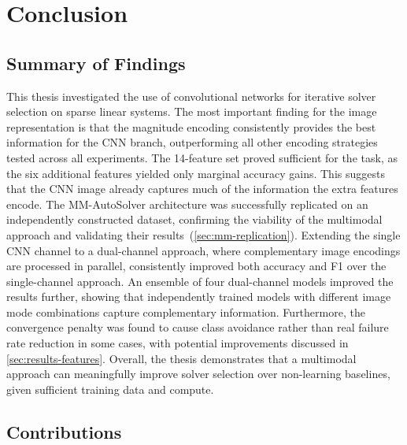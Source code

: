 
\chapter{Conclusion}\label{chapter:conclusion}

\section{Summary of Findings}\label{sec:summary-findings}

This thesis investigated the use of convolutional networks for iterative solver selection on sparse linear systems.
The most important finding for the image representation is that the magnitude encoding consistently provides the best information
for the CNN branch, outperforming all other encoding strategies tested across all experiments.
The 14-feature set proved sufficient for the task,
as the six additional features yielded only marginal accuracy gains. This suggests that the CNN image already captures much of the information
the extra features encode.
The MM-AutoSolver architecture was successfully replicated on an independently constructed dataset, confirming the viability of the multimodal approach and
validating their results~(\autoref{sec:mm-replication}).
Extending the single CNN channel to a dual-channel approach, where complementary image encodings are processed in parallel, consistently improved both accuracy and F1 over the
single-channel approach.
An ensemble of four dual-channel models improved the results further, showing that independently trained models with different image mode combinations capture complementary information.
Furthermore, the convergence penalty was found to cause class avoidance rather than real failure rate reduction in some cases, with potential
improvements discussed in \autoref{sec:results-features}.
Overall, the thesis demonstrates that a multimodal approach can meaningfully improve solver selection over non-learning baselines,
given sufficient training data and compute.

\section{Contributions}\label{sec:final-contributions}

